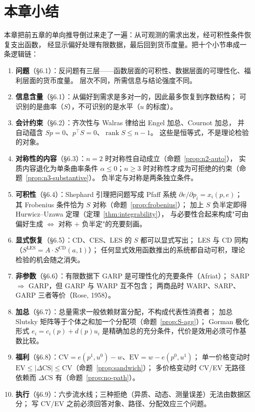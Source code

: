 \section{本章小结}

本章把前五章的单向推导倒过来走了一遍：从可观测的需求出发，经可积性条件恢复支出函数，
经显示偏好处理有限数据，最后回到货币度量。把十个小节串成一条逻辑链：

\begin{enumerate}
\item \textbf{问题}（\S 6.1）：反问题有三层——函数层面的可积性、数据层面的可理性化、福利层面的货币度量。
      层次不同，所需信息与结论强度不同。
\item \textbf{信息含量}（\S 6.1）：从偏好到需求是多对一的，因此最多恢复到序数结构；
      可识别的是曲率（$S$），不可识别的是水平（$u$ 的标度）。
\item \textbf{会计约束}（\S 6.2）：齐次性与 Walras 律给出 Engel 加总、Cournot 加总，
      并自动蕴含 $Sp=0$、$p^{\top}S=0$、$\operatorname{rank}S\le n-1$。
      这些是恒等式，不是理论检验的对象。
\item \textbf{对称性的内容}（\S 6.3）：$n=2$ 时对称性自动成立（命题~\ref{prop:n2-auto}），
      实质内容退化为单条曲率条件 $\alpha\le0$；$n\ge3$ 时对称性才成为可拒绝的约束（命题~\ref{prop:n3-substantive}）。
      负半定与对称是两条独立条件。
\item \textbf{可积性}（\S 6.4）：Shephard 引理把问题写成 Pfaff 系统 $\partial e/\partial p_i=x_i(p,e)$；
      其 Frobenius 条件恰为 $S$ 对称（命题~\ref{prop:frobenius}）；
      加上 $S$ 负半定即得 Hurwicz--Uzawa 定理（定理~\ref{thm:integrability}），
      与必要性合起来构成"可由偏好生成 $\iff$ 对称 $+$ 负半定"的充要刻画。
\item \textbf{显式恢复}（\S 6.5）：CD、CES、LES 的 $S$ 都可以显式写出；
      LES 与 CD 同构（$S^{\mathrm{LES}}=A\cdot S^{\mathrm{CD}}(a,1)$）；
      任何显式效用函数推出的系统都自动可积，理论检验的机会随之消失。
\item \textbf{非参数}（\S 6.6）：有限数据下 GARP 是可理性化的充要条件（Afriat）；
      SARP $\Rightarrow$ GARP，但 GARP 与 WARP 互不包含；
      两商品时 WARP、SARP、GARP 三者等价（Rose, 1958）。
\item \textbf{加总}（\S 6.7）：总量需求一般依赖财富分配，不构成代表性消费者；
      加总 Slutsky 矩阵等于个体之和加一个分配项（命题~\ref{prop:S-agg}）；
      Gorman 极化形式 $e_i=c_i(p)+d(p)u_i$ 是精确加总的充分条件，代价是效用必须可作基数比较。
\item \textbf{福利}（\S 6.8）：$\mathrm{CV}=e(p^1,u^0)-w$、$\mathrm{EV}=w-e(p^0,u^1)$；
      单一价格变动时 $\mathrm{EV}\le|\Delta\mathrm{CS}|\le\mathrm{CV}$（命题~\ref{prop:sandwich}）；
      多价格变动时 CV/EV 无路径依赖而 $\Delta\mathrm{CS}$ 有（命题~\ref{prop:no-path}）。
\item \textbf{执行}（\S 6.9）：六步流水线；三种拒绝（异质、动态、测量误差）无法由数据区分；
      写 CV/EV 之前必须回答对象、路径、分配效应三个问题。
\end{enumerate}


